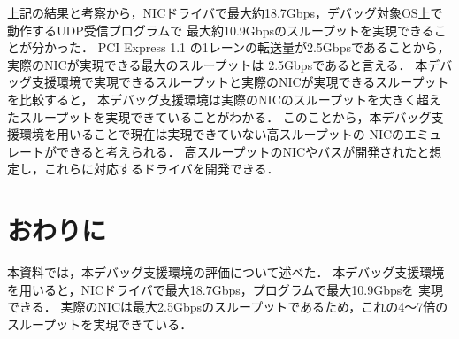 \documentclass[12pt]{jsarticle}
\begin{document}
上記の結果と考察から，NICドライバで最大約18.7Gbps，デバッグ対象OS上で動作するUDP受信プログラムで
最大約10.9Gbpsのスループットを実現できることが分かった．
PCI Express 1.1 の1レーンの転送量が2.5Gbpsであることから，実際のNICが実現できる最大のスループットは
2.5Gbpsであると言える．
本デバッグ支援環境で実現できるスループットと実際のNICが実現できるスループットを比較すると，
本デバッグ支援環境は実際のNICのスループットを大きく超えたスループットを実現できていることがわかる．
このことから，本デバッグ支援環境を用いることで現在は実現できていない高スループットの
NICのエミュレートができると考えられる．
高スループットのNICやバスが開発されたと想定し，これらに対応するドライバを開発できる．

\section{おわりに}

本資料では，本デバッグ支援環境の評価について述べた．
本デバッグ支援環境を用いると，NICドライバで最大18.7Gbps，プログラムで最大10.9Gbpsを
実現できる．
実際のNICは最大2.5Gbpsのスループットであるため，これの4〜7倍のスループットを実現できている．
\end{document}
